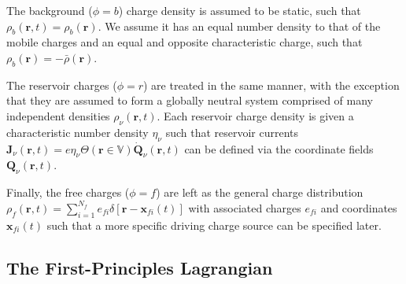 \documentclass{article}
\begin{document}
The background ($\phi = b$) charge density is assumed to be static, such that $\rho_b(\mathbf{r},t) = \rho_b(\mathbf{r})$. We assume it has an equal number density to that of the mobile charges and an equal and opposite characteristic charge, such that $\rho_b(\mathbf{r}) = -\bar{\rho}(\mathbf{r})$.

The reservoir charges ($\phi = r$) are treated in the same manner, with the exception that they are assumed to form a globally neutral system comprised of many independent densities $\rho_\nu(\mathbf{r},t)$. Each reservoir charge density is given a characteristic number density $\eta_\nu$  such that reservoir currents $\mathbf{J}_\nu(\mathbf{r},t) = e\eta_\nu\Theta(\mathbf{r}\in\mathbb{V})\dot{\mathbf{Q}}_\nu(\mathbf{r},t)$ can be defined via the coordinate fields $\mathbf{Q}_\nu(\mathbf{r},t)$.

Finally, the free charges ($\phi = f$) are left as the general charge distribution $\rho_f(\mathbf{r},t) = \sum_{i = 1}^{N_f}e_{fi}\delta[\mathbf{r} - \mathbf{x}_{fi}(t)]$ with associated charges $e_{fi}$ and coordinates $\mathbf{x}_{fi}(t)$ such that a more specific driving charge source can be specified later.












\subsection{The First-Principles Lagrangian}\label{sec:LagrangianExpansion}
\end{document}
